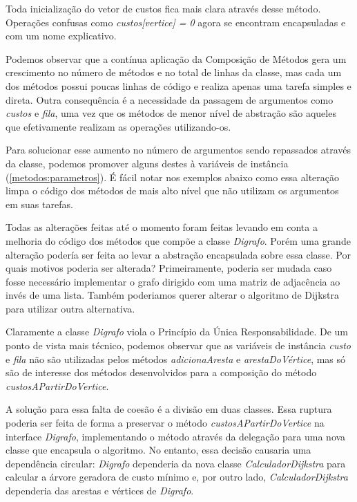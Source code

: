 

Toda inicialização do vetor de custos fica mais clara através desse método. Operações confusas como 
\textit{custos[vertice] = 0} agora se encontram encapsuladas e com um nome explicativo.

Podemos observar que a contínua aplicação da Composição de Métodos gera um crescimento no número de métodos e no total de 
linhas da classe, mas cada um dos métodos possui poucas linhas de código e realiza apenas uma tarefa simples e direta. 
Outra consequência é a necessidade da passagem de argumentos como \textit{custos} e \textit{fila}, uma vez que os métodos 
de menor nível de abstração são aqueles que efetivamente realizam as operações utilizando-os.

Para solucionar esse aumento no número de argumentos sendo repassados através da classe, podemos promover alguns destes à 
variáveis de instância (\ref{metodos:parametros}). É fácil notar nos exemplos abaixo como essa alteração limpa o código 
dos métodos de mais alto nível que não utilizam os argumentos em suas tarefas.



Todas as alterações feitas até o momento foram feitas levando em conta a melhoria do código dos métodos que compõe a 
classe \textit{Digrafo}. Porém uma grande alteração podería ser feita ao levar a abstração encapsulada sobre essa classe.
Por quais motivos poderia ser alterada? Primeiramente, poderia ser mudada caso fosse necessário implementar o grafo 
dirigido com uma matriz de adjacência ao invés de uma lista. Também poderiamos querer alterar o algoritmo de Dijkstra 
para utilizar outra alternativa.

Claramente a classe \textit{Digrafo} viola o Princípio da Única Responsabilidade. De um ponto de vista mais técnico, 
podemos observar que as variáveis de instância \textit{custo} e \textit{fila} não são utilizadas pelos métodos 
\textit{adicionaAresta} e \textit{arestaDoVértice}, mas só são de interesse dos métodos desenvolvidos para a composição 
do método \textit{custosAPartirDoVertice}.

A solução para essa falta de coesão é a divisão em duas classes. Essa ruptura poderia ser feita de forma a preservar o 
método \textit{custosAPartirDoVertice} na interface \textit{Digrafo}, implementando o método através da delegação para 
uma nova classe que encapsula o algoritmo. No entanto, essa decisão causaria uma dependência circular: \textit{Digrafo} 
dependeria da nova classe \textit{CalculadorDijkstra} para calcular a árvore geradora de custo mínimo e, por outro lado,
\textit{CalculadorDijkstra} dependeria das arestas e vértices de \textit{Digrafo}.

